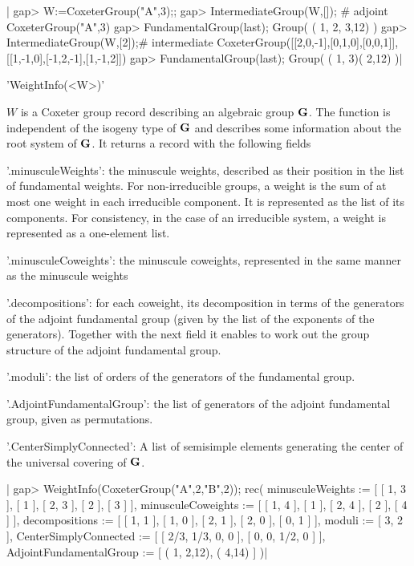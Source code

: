 |    gap> W:=CoxeterGroup("A",3);;
    gap> IntermediateGroup(W,[]); # adjoint
    CoxeterGroup("A",3)
    gap> FundamentalGroup(last);
    Group( ( 1, 2, 3,12) )
    gap> IntermediateGroup(W,[2]);# intermediate
    CoxeterGroup([[2,0,-1],[0,1,0],[0,0,1]],[[1,-1,0],[-1,2,-1],[1,-1,2]])
    gap> FundamentalGroup(last);
    Group( ( 1, 3)( 2,12) )|


'WeightInfo(<W>)'

$W$  is a  Coxeter group  record describing  an algebraic  group ${\mathbf G}$. The
function  is independent  of the  isogeny type  of ${\mathbf G}$ and describes some
information  about the root system  of ${\mathbf G}$. It returns  a record with the
following fields\:

'.minusculeWeights': the minuscule weights, described as their position in 
   the list of fundamental weights. For non-irreducible groups, a weight is
   the  sum of  at most  one weight  in each  irreducible component.  It is
   represented  as the list of its components. For consistency, in the case
   of an irreducible system, a weight is represented as a one-element list.

'.minusculeCoweights': the minuscule coweights, represented in the same 
   manner as the minuscule weights

'.decompositions': for each coweight, its decomposition in terms of the
   generators  of the adjoint  fundamental group (given  by the list of the
   exponents of the generators). Together with the next field it enables to
   work out the group structure of the adjoint fundamental group.

'.moduli': the list of orders of the generators of the fundamental group.

'.AdjointFundamentalGroup': the list of generators of the adjoint fundamental
   group, given as permutations.

'.CenterSimplyConnected': A list of semisimple elements generating the center
   of the universal covering of ${\mathbf G}$.

|    gap> WeightInfo(CoxeterGroup("A",2,"B",2));
    rec(
      minusculeWeights := [ [ 1, 3 ], [ 1 ], [ 2, 3 ], [ 2 ], [ 3 ] ],
      minusculeCoweights := [ [ 1, 4 ], [ 1 ], [ 2, 4 ], [ 2 ], [ 4 ] ],
      decompositions := [ [ 1, 1 ], [ 1, 0 ], [ 2, 1 ], [ 2, 0 ], [ 0, 1 ] ],
      moduli := [ 3, 2 ],
      CenterSimplyConnected := [ [ 2/3, 1/3, 0, 0 ], [ 0, 0, 1/2, 0 ] ],
      AdjointFundamentalGroup := [ ( 1, 2,12), ( 4,14) ] )|

